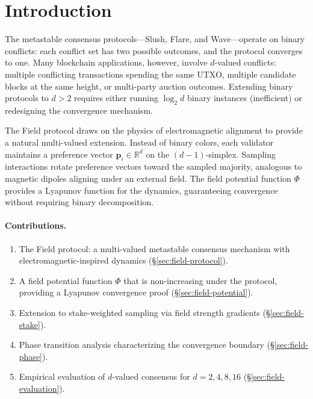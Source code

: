 \section{Introduction}

\label{sec:field-introduction}

The metastable consensus protocols---Slush, Flare, and Wave---operate on binary conflicts:
each conflict set has two possible outcomes, and the protocol converges to one. Many
blockchain applications, however, involve $d$-valued conflicts: multiple conflicting
transactions spending the same UTXO, multiple candidate blocks at the same height, or
multi-party auction outcomes. Extending binary protocols to $d > 2$ requires either
running $\log_2 d$ binary instances (inefficient) or redesigning the convergence mechanism.

The Field protocol draws on the physics of electromagnetic alignment to provide a natural
multi-valued extension. Instead of binary colors, each validator maintains a preference
vector $\mathbf{p}_i \in \mathbb{R}^d$ on the $(d-1)$-simplex. Sampling interactions
rotate preference vectors toward the sampled majority, analogous to magnetic dipoles
aligning under an external field. The field potential function $\Phi$ provides a
Lyapunov function for the dynamics, guaranteeing convergence without requiring
binary decomposition.

\paragraph{Contributions.}
\begin{enumerate}[nosep]
\item The Field protocol: a multi-valued metastable consensus mechanism with
electromagnetic-inspired dynamics (\S\ref{sec:field-protocol}).
\item A field potential function $\Phi$ that is non-increasing under the protocol,
providing a Lyapunov convergence proof (\S\ref{sec:field-potential}).
\item Extension to stake-weighted sampling via field strength gradients (\S\ref{sec:field-stake}).
\item Phase transition analysis characterizing the convergence boundary (\S\ref{sec:field-phase}).
\item Empirical evaluation of $d$-valued consensus for $d = 2, 4, 8, 16$ (\S\ref{sec:field-evaluation}).
\end{enumerate}

